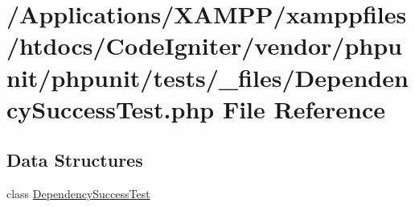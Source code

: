\hypertarget{_dependency_success_test_8php}{}\section{/\+Applications/\+X\+A\+M\+P\+P/xamppfiles/htdocs/\+Code\+Igniter/vendor/phpunit/phpunit/tests/\+\_\+files/\+Dependency\+Success\+Test.php File Reference}
\label{_dependency_success_test_8php}
\subsection*{Data Structures}
\begin{DoxyCompactItemize}
\item 
class \mbox{\hyperlink{class_dependency_success_test}{Dependency\+Success\+Test}}
\end{DoxyCompactItemize}
